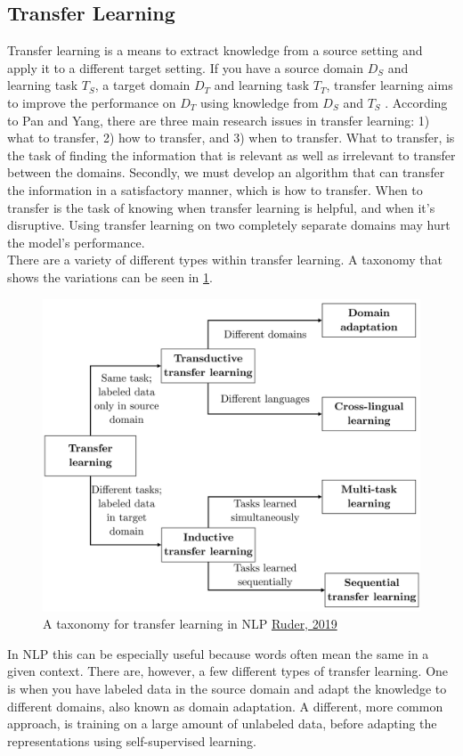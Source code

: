 \documentclass{report}
\begin{document}
\subsection{Transfer Learning}
Transfer learning is a means to extract knowledge from a source setting and apply it to a different target setting. If you have a source domain $D_S$ and learning task $T_S$, a target domain $D_T$ and learning task $T_T$, transfer learning aims to improve the performance on $D_T$ using knowledge from $D_S$ and $T_S$ \cite{5288526}. According to Pan and Yang, there are three main research issues in transfer learning: 1) what to transfer, 2) how to transfer, and 3) when to transfer. What to transfer, is the task of finding the information that is relevant as well as irrelevant to transfer between the domains. Secondly, we must develop an algorithm that can transfer the information in a satisfactory manner, which is how to transfer. When to transfer is the task of knowing when transfer learning is helpful, and when it's disruptive. Using transfer learning on two completely separate domains may hurt the model's performance\cite{5288526}.\\
There are a variety of different types within transfer learning. A taxonomy that shows the variations can be seen in \ref{fig:tltax}.
\begin{figure}[h!]
	\centering
	\includegraphics[scale=0.13]{img/tl_taxonomy}
	\caption{A taxonomy for transfer learning in NLP \href{ruder.io/thesis/neural_transfer_learning_for_nlp.pdf}{Ruder, 2019}}
		\label{fig:tltax}
\end{figure}%
In NLP this can be especially useful because words often mean the same in a given context. There are, however, a few different types of transfer learning. One is when you have labeled data in the source domain and adapt the knowledge to different domains, also known as domain adaptation. A different, more common approach, is training on a large amount of unlabeled data, before adapting the representations using self-supervised learning.
\end{document}
